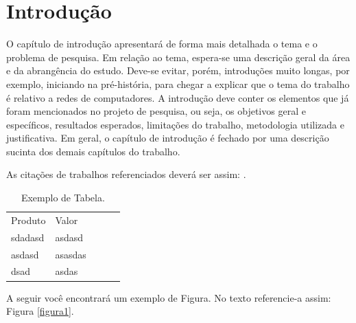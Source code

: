 \documentclass[
	article,			%
	11pt,				%
	oneside,			%
	a4paper,			%
	english,			%
	brazil,				%
	sumario=tradicional
	]{abntex2}
\begin{document}

\textual

\section{Introdução} %



O capítulo de introdução apresentará de forma mais detalhada o tema e o problema de pesquisa. Em relação ao
tema, espera-se uma descrição geral da área e da abrangência do estudo. Deve-se evitar, porém, introduções
muito longas, por exemplo, iniciando na pré-história, para chegar a explicar que o tema do trabalho é relativo a
redes de computadores.
A introdução deve conter os elementos que já foram mencionados no projeto de pesquisa, ou seja, os
objetivos geral e específicos, resultados esperados, limitações do trabalho, metodologia utilizada e justificativa.
Em geral, o capítulo de introdução é fechado por uma descrição sucinta dos demais capítulos do trabalho.

As citações de trabalhos referenciados deverá ser assim: \cite{talbot2012}.


\begin{table}[hbt] %
	\begin{center}
		\caption{Exemplo de Tabela.} %
		\begin{tabular}{|l|l|lll}
			\cline{1-2}
			Produto & Valor   &  &  &  \\ \cline{1-2}\cline{1-2}
			sdadasd & asdasd  &  &  &  \\ \cline{1-2}
			asdasd  & asasdas &  &  &  \\ \cline{1-2}
			dsad    & asdas   &  &  &  \\ \cline{1-2}
		\end{tabular}
	\end{center}
\end{table}

A seguir você encontrará um exemplo de Figura. No texto referencie-a assim: Figura \ref{figura1}.
\end{document}

